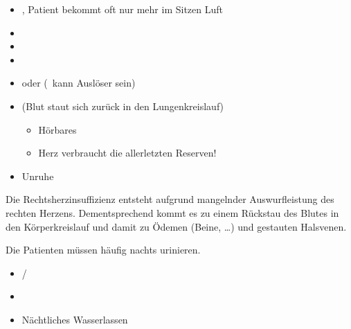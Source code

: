 {}{
\begin{itemize}
  \item {}, Patient bekommt oft nur mehr im
    Sitzen Luft 
  \item {}
  \item {}
  \item {}
  \item {} oder  (\, kann Auslöser
  sein)
  \item {} (Blut staut sich
  zurück in den Lungenkreislauf)
  \begin{itemize}
  \item Hörbares 
  \item Herz verbraucht die allerletzten Reserven!
\end{itemize}
  \item Unruhe
\end{itemize}
}{}{}{}

{%
\label{topic:rechtsherzinsuffizienz}
%
Die Rechtsherzinsuffizienz entsteht aufgrund mangelnder
Auswurfleistung des rechten Herzens. Dementsprechend kommt
es zu einem Rückstau des Blutes in den Körperkreislauf und
damit zu Ödemen (Beine, \ldots) und gestauten Halsvenen.

Die Patienten müssen häufig nachts urinieren. 
}{
\begin{itemize}
  \item {}/
  \item {}
  \item Nächtliches Wasserlassen
\end{itemize}
}{}{}{}





